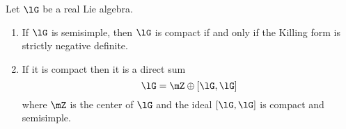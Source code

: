 \begin{proposition}     \label{ProplGcompactKillNeg}\label{prop:compact_Killing}
	Let $\lG$ be a real Lie algebra.
	\begin{enumerate}
		\item If $\lG$ is semisimple, then $\lG$ is compact if and only if  the Killing form is strictly negative definite.
		\item If it is compact then it is a direct sum
		      \begin{equation}
			      \lG=\mZ\oplus [\lG,\lG]
		      \end{equation}
		      where $\mZ$ is the center of $\lG$ and the ideal $[\lG,\lG]$ is compact and semisimple.
	\end{enumerate}
\end{proposition}

